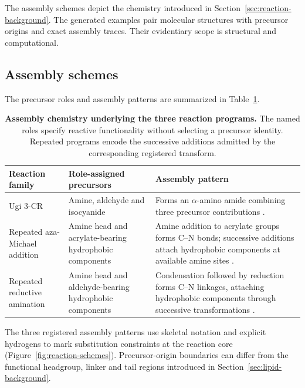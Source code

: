 \documentclass{article}
\theoremstyle{definition}
\begin{document}
The assembly schemes depict the chemistry introduced in Section~\ref{sec:reaction-background}.
The generated examples pair molecular structures with precursor origins and exact assembly traces.
Their evidentiary scope is structural and computational.

\subsection{Assembly schemes}
\label{app:chemistry}
The precursor roles and assembly patterns are summarized in Table~\ref{tab:reaction-family-background}.

\begin{table}[htbp]
\caption{\textbf{Assembly chemistry underlying the three reaction programs.}
The named roles specify reactive functionality without selecting a precursor identity. Repeated
programs encode the successive additions admitted by the corresponding registered transform.}
\label{tab:reaction-family-background}
\centering
\small
\begin{tabular}{@{}>{\raggedright\arraybackslash}p{}>{\raggedright\arraybackslash}p{}>{\raggedright\arraybackslash}p{}@{}}
\toprule
Reaction family & Role-assigned precursors & Assembly pattern \\
\midrule
Ugi 3-CR & Amine, aldehyde and isocyanide &
Forms an $\alpha$-amino amide combining three precursor contributions \citep{xu2024agile}. \\
\addlinespace
Repeated aza-Michael addition & Amine head and acrylate-bearing hydrophobic components &
Amine addition to acrylate groups forms C--N bonds; successive additions attach hydrophobic
components at available amine sites \citep{li2023combinatorial}. \\
\addlinespace
Repeated reductive amination & Amine head and aldehyde-bearing hydrophobic components &
Condensation followed by reduction forms C--N linkages, attaching hydrophobic components through
successive transformations \citep{xue2024barcoding}. \\
\bottomrule
\end{tabular}
\end{table}

The three registered assembly patterns use skeletal notation and explicit hydrogens
to mark substitution constraints at the reaction core (Figure~\ref{fig:reaction-schemes}).
Precursor-origin boundaries can differ from the functional headgroup, linker and tail regions
introduced in Section~\ref{sec:lipid-background}.
\end{document}
